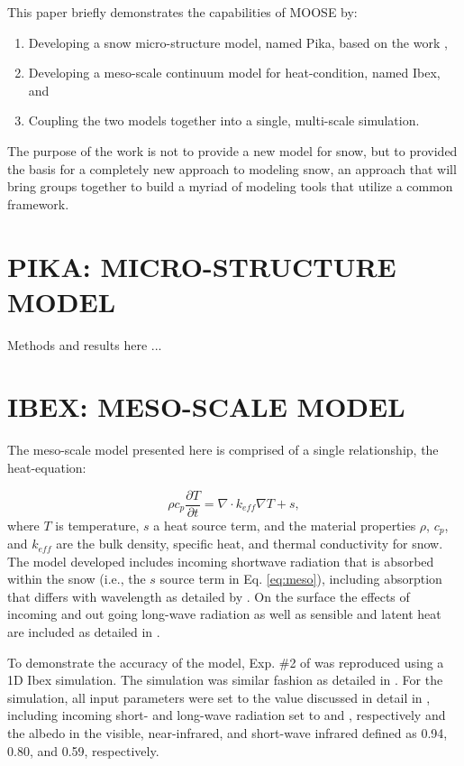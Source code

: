 This paper briefly demonstrates the capabilities of MOOSE by:
\begin{enumerate}
\item Developing a snow micro-structure model, named Pika, based on the work \citep{kaempfer2009phase},
\item Developing a meso-scale continuum model for heat-condition, named Ibex, and
\item Coupling the two models together into a single, multi-scale simulation.
\end{enumerate}

The purpose of the work is not to provide a new model for snow, but to provided the basis for a completely new approach to modeling snow, an approach that will bring groups together to build a myriad of modeling tools that utilize a common framework.

\section{PIKA: MICRO-STRUCTURE MODEL}\label{sec:pika}
Methods and results here ...

\section{IBEX: MESO-SCALE MODEL}\label{sec:ibex}
The meso-scale model presented here is comprised of a single relationship, the heat-equation:

\begin{equation}\label{eq:meso}
\rho c_p \frac{\partial{T}}{\partial t} = \nabla \cdot k_{eff} \nabla T + s,
\end{equation}
where $T$ is temperature, $s$ a heat source term, and the material properties $\rho$, $c_p$, and $k_{eff}$ are the bulk density, specific heat, and thermal conductivity for snow. The model developed includes incoming shortwave radiation that is absorbed within the snow (i.e., the $s$ source term in Eq. \eqref{eq:meso}), including absorption that differs with wavelength as detailed by \citet[][Ch. 4]{slaughter2010numerical}. On the surface the effects of incoming and out going long-wave radiation as well as sensible and latent heat are included as detailed in \citet{morstad2007experimental}.

To demonstrate the accuracy of the model, Exp. \#2 of \citet{morstad2007experimental} was reproduced using a 1D Ibex simulation. The simulation was similar fashion as detailed in \citet[][Ch. 4]{slaughter2010numerical}. For the simulation, all input parameters were set to the value discussed in detail in \citet{slaughter2010numerical}, including incoming short- and long-wave radiation set to  and , respectively and the albedo in the visible, near-infrared, and short-wave infrared defined as 0.94, 0.80, and 0.59, respectively.

